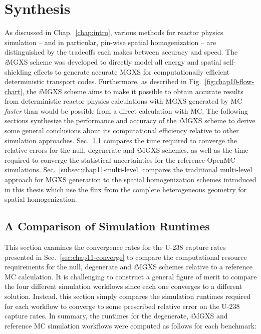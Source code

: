 \section{Synthesis}
\label{sec:chap11-synthesis}

As discussed in Chap.~\ref{chap:intro}, various methods for reactor physics simulation -- and in particular, pin-wise spatial homogenization -- are distinguished by the tradeoffs each makes between accuracy and speed. The \textit{i}\ac{MGXS} scheme was developed to directly model all energy and spatial self-shielding effects to generate accurate \ac{MGXS} for computationally efficient deterministic transport codes. Furthermore, as described in Fig.~\ref{fig:chap10-flow-chart}, the \textit{i}\ac{MGXS} scheme aims to make it possible to obtain accurate results from deterministic reactor physics calculations with \ac{MGXS} generated by \ac{MC} \textit{faster} than would be possible from a direct calculation with \ac{MC}. The following sections synthesize the performance and accuracy of the \textit{i}\ac{MGXS} scheme to derive some general conclusions about its computational efficiency relative to other simulation approaches. Sec.~\ref{subsec:chap11-runtimes} compares the time required to converge the relative errors for the null, degenerate and \textit{i}\ac{MGXS} schemes, as well as the time required to converge the statistical uncertainties for the reference OpenMC simulations. Sec.~\ref{subsec:chap11-multi-level} compares the traditional multi-level approach for \ac{MGXS} generation to the spatial homogenization schemes introduced in this thesis which use the flux from the complete heterogeneous geometry for spatial homogenization.

\subsection{A Comparison of Simulation Runtimes}
\label{subsec:chap11-runtimes}

This section examines the convergence rates for the U-238 capture rates presented in Sec.~\ref{sec:chap11-converge} to compare the computational resource requirements for the null, degenerate and \textit{i}\ac{MGXS} schemes relative to a reference \ac{MC} calculation. It is challenging to construct a general figure of merit to compare the four different simulation workflows since each one converges to a different solution. Instead, this section simply compares the simulation runtimes required for each workflow to converge to some prescribed relative error on the U-238 capture rates. In summary, the runtimes for the degenerate, \textit{i}\ac{MGXS} and reference \ac{MC} simulation workflows were computed as follows for each benchmark:

